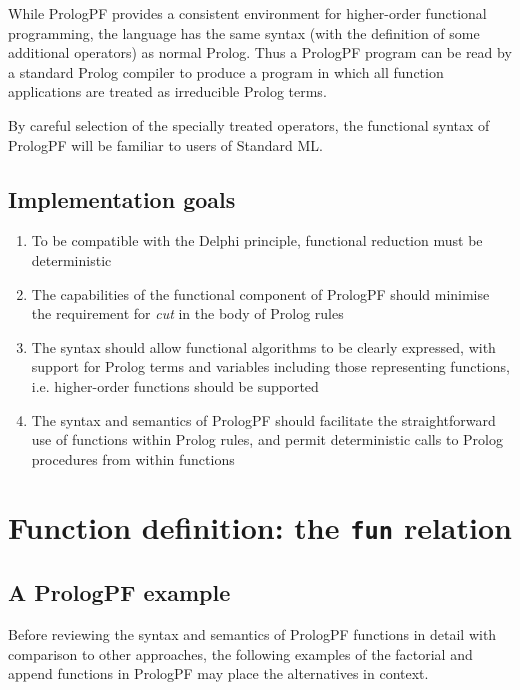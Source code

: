 While PrologPF provides a consistent environment for
higher-order functional
programming, the language has the same syntax (with the definition of some
additional operators) as normal Prolog.  Thus a PrologPF program can be
read by a standard Prolog compiler to produce a program in which all
function applications are treated as irreducible Prolog terms.

By careful selection of the specially treated operators, the functional
syntax of PrologPF will be familiar to users of Standard ML.

\subsection{Implementation goals}

\begin{enumerate}
\item{To  be compatible with the Delphi principle, functional reduction
  must be deterministic}
\item{The capabilities of the functional component of PrologPF should
  minimise the requirement for \textit{cut} in the body of Prolog
  rules}
\item{The syntax should allow functional algorithms to be clearly expressed,
  with support for Prolog terms and variables including those representing
  functions, i.e. higher-order functions should be supported}
\item{The syntax and semantics of PrologPF should facilitate the
  straightforward use of functions within Prolog rules, and permit
  deterministic calls to Prolog procedures from within functions}
\end{enumerate}

\section{Function definition: the \texttt{fun} relation} %
\label{definition}
\enlargethispage{-2\baselineskip} %

\subsection{A PrologPF example}

Before reviewing the syntax and semantics of PrologPF functions in detail with
comparison to other approaches, the following examples of the factorial and
append functions in PrologPF may place the alternatives in context.

